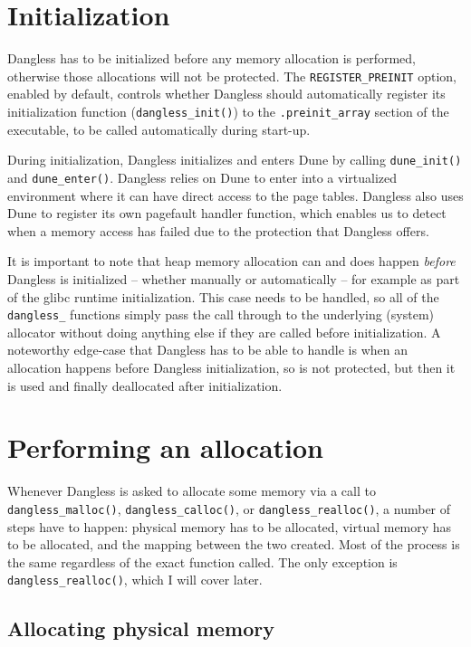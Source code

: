 \section{Initialization}
\label{sec:dangless-init}

Dangless has to be initialized before any memory allocation is performed, otherwise those allocations will not be protected. The \lstinline!REGISTER_PREINIT! option, enabled by default, controls whether Dangless should automatically register its initialization function (\lstinline!dangless_init()!) to the \lstinline!.preinit_array! section of the executable, to be called automatically during start-up.

During initialization, Dangless initializes and enters Dune by calling \lstinline!dune_init()! and \lstinline!dune_enter()!. Dangless relies on Dune to enter into a virtualized environment where it can have direct access to the page tables. Dangless also uses Dune to register its own pagefault handler function, which enables us to detect when a memory access has failed due to the protection that Dangless offers.

It is important to note that heap memory allocation can and does happen \emph{before} Dangless is initialized -- whether manually or automatically -- for example as part of the glibc runtime initialization. This case needs to be handled, so all of the \lstinline!dangless_! functions simply pass the call through to the underlying (system) allocator without doing anything else if they are called before initialization. A noteworthy edge-case that Dangless has to be able to handle is when an allocation happens before Dangless initialization, so is not protected, but then it is used and finally deallocated after initialization.

\section{Performing an allocation}

Whenever Dangless is asked to allocate some memory via a call to \lstinline!dangless_malloc()!, \lstinline!dangless_calloc()!, or \lstinline!dangless_realloc()!, a number of steps have to happen: physical memory has to be allocated, virtual memory has to be allocated, and the mapping between the two created. Most of the process is the same regardless of the exact function called. The only exception is \lstinline!dangless_realloc()!, which I will cover later.

\subsection{Allocating physical memory}

